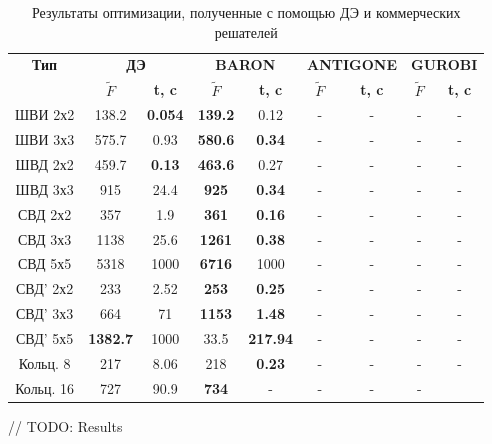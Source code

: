 \begin{table}[!h]
\centering
\caption{ Результаты оптимизации, полученные с помощью ДЭ и коммерческих решателей}
\begin{tabular}{|c|c c|c c|c c|c c|}
    \hline
    \multirow{2}{*}{\textbf{Тип}} & \multicolumn{2}{c}{\textbf{ДЭ}} & \multicolumn{2}{|c|}{\textbf{BARON}} & \multicolumn{2}{|c|}{\textbf{ANTIGONE}} & \multicolumn{2}{|c|}{\textbf{GUROBI}}\\
    & \textbf{$\tilde{F}$} & \textbf{t, c} & \textbf{$\tilde{F}$} & \textbf{t, c} & \textbf{$\tilde{F}$} & \textbf{t, c} & \textbf{$\tilde{F}$} & \textbf{t, c} \\
    \hline
    ШВИ 2х2 & 138.2 & \textbf{0.054} & \textbf{139.2} & 0.12 & - & - & - & - \\
    ШВИ 3х3 & 575.7 & 0.93 & \textbf{580.6} & \textbf{0.34} & - & - & - & -\\
    ШВД 2х2 & 459.7 & \textbf{0.13} & \textbf{463.6} & 0.27 &  - & - & - & - \\
    ШВД 3х3 & 915 & 24.4 & \textbf{925} & \textbf{0.34}  &  - & - & - & - \\
    СВД 2х2 & 357 & 1.9 & \textbf{361} & \textbf{0.16} &  - & - & - & - \\
    СВД 3х3 & 1138 & 25.6 & \textbf{1261} & \textbf{0.38} &  - & - & - & - \\
    СВД 5х5 & 5318 & 1000 & \textbf{6716} & 1000 & - & - & - & - \\
    СВД' 2х2 & 233 & 2.52 & \textbf{253} & \textbf{0.25} & - & - & - & -\\
    СВД' 3х3 & 664 & 71 & \textbf{1153} & \textbf{1.48} & - & - & - & - \\
    СВД' 5х5 & \textbf{1382.7} & 1000 & 33.5 & \textbf{217.94}  &  - & - & - & - \\
    Кольц. 8 & 217 & 8.06 & 218 & \textbf{0.23} & - & - & - & - \\
    Кольц. 16 & 727 & 90.9 & \textbf{734} & - & - & - & -\\
    \hline
\end{tabular}
\label{tab:results_de}
\end{table}

// TODO: Results

